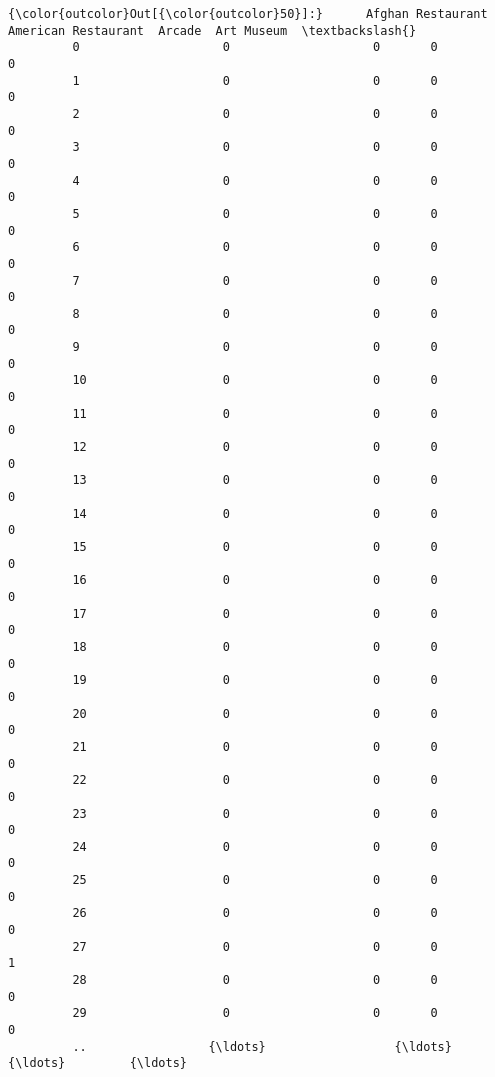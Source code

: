 \documentclass[11pt]{article}
\begin{document}
\begin{Verbatim}[commandchars=\\\{\}]
{\color{outcolor}Out[{\color{outcolor}50}]:}      Afghan Restaurant  American Restaurant  Arcade  Art Museum  \textbackslash{}
         0                    0                    0       0           0   
         1                    0                    0       0           0   
         2                    0                    0       0           0   
         3                    0                    0       0           0   
         4                    0                    0       0           0   
         5                    0                    0       0           0   
         6                    0                    0       0           0   
         7                    0                    0       0           0   
         8                    0                    0       0           0   
         9                    0                    0       0           0   
         10                   0                    0       0           0   
         11                   0                    0       0           0   
         12                   0                    0       0           0   
         13                   0                    0       0           0   
         14                   0                    0       0           0   
         15                   0                    0       0           0   
         16                   0                    0       0           0   
         17                   0                    0       0           0   
         18                   0                    0       0           0   
         19                   0                    0       0           0   
         20                   0                    0       0           0   
         21                   0                    0       0           0   
         22                   0                    0       0           0   
         23                   0                    0       0           0   
         24                   0                    0       0           0   
         25                   0                    0       0           0   
         26                   0                    0       0           0   
         27                   0                    0       0           1   
         28                   0                    0       0           0   
         29                   0                    0       0           0   
         ..                 {\ldots}                  {\ldots}     {\ldots}         {\ldots}   

\end{Verbatim}
\end{document}
